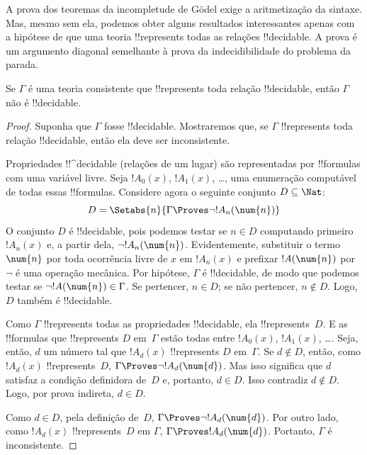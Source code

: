 \documentclass[../../../include/open-logic-section]{subfiles}
\begin{document}


A prova dos teoremas da incompletude de G\"odel exige a aritmetização
da sintaxe. Mas, mesmo sem ela, podemos obter alguns resultados
interessantes apenas com a hipótese de que uma teoria !!{represents}
todas as relações !!{decidable}. A prova é um argumento diagonal
semelhante à prova da indecidibilidade do problema da parada.

\begin{thm}
Se $\Gamma$ é uma teoria consistente que !!{represents} toda relação
!!{decidable}, então $\Gamma$ não é !!{decidable}.
\end{thm}

\begin{proof}
Suponha que $\Gamma$ fosse !!{decidable}. Mostraremos que, se $\Gamma$
!!{represents} toda relação !!{decidable}, então ela deve ser
inconsistente.

Propriedades !!^{decidable} (relações de um lugar) são representadas
por !!{formula}s com uma variável livre. Seja $!A_0(x)$, $!A_1(x)$,
\dots, uma enumeração computável de todas essas !!{formula}s. Considere
agora o seguinte conjunto $D \subseteq \Nat$:
\[
D = \Setabs{n}{\Gamma \Proves \lnot !A_n(\num{n})}
\]
O conjunto $D$ é !!{decidable}, pois podemos testar se $n \in D$
computando primeiro $!A_n(x)$ e, a partir dela,
$\lnot !A_n(\num{n})$. Evidentemente, substituir o termo $\num{n}$ por
toda ocorrência livre de $x$ em $!A_n(x)$ e prefixar
$!A(\num{n})$ por $\lnot$ é uma operação mecânica. Por hipótese,
$\Gamma$ é !!{decidable}, de modo que podemos testar se
$\lnot !A(\num{n}) \in \Gamma$. Se pertencer, $n \in D$; se não
pertencer, $n \notin D$. Logo, $D$ também é !!{decidable}.

Como $\Gamma$ !!{represents} todas as propriedades !!{decidable}, ela
!!{represents}~$D$. E as !!{formula}s que !!{represents} $D$
em~$\Gamma$ estão todas entre $!A_0(x)$, $!A_1(x)$, \dots. Seja, então,
$d$ um número tal que $!A_d(x)$ !!{represents} $D$ em~$\Gamma$. Se
$d \notin D$, então, como $!A_d(x)$ !!{represents}~$D$,
$\Gamma \Proves \lnot !A_d(\num{d})$. Mas isso significa que $d$
satisfaz a condição definidora de~$D$ e, portanto, $d \in D$. Isso
contradiz $d \notin D$. Logo, por prova indireta, $d \in D$.

Como $d \in D$, pela definição de~$D$, $\Gamma \Proves \lnot
!A_d(\num{d})$. Por outro lado, como $!A_d(x)$ !!{represents}~$D$
em $\Gamma$, $\Gamma \Proves !A_d(\num{d})$. Portanto, $\Gamma$ é
inconsistente.
\end{proof}
\end{document}
